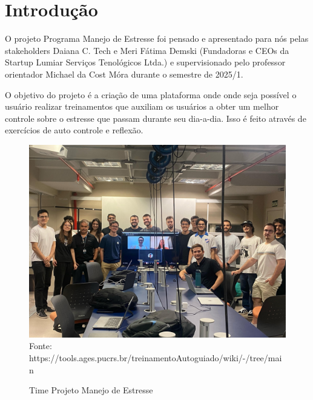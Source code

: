 \section[Introdução]{Introdução}

O projeto Programa Manejo de Estresse foi pensado e apresentado para nós pelas stakeholders Daiana C. Tech e Meri Fátima Demski (Fundadoras e CEOs da Startup Lumiar Serviços Tenológicos Ltda.) e supervisionado pelo professor orientador Michael da Cost Móra durante o semestre de 2025/1.

O objetivo do projeto é a criação de uma plataforma onde onde seja possível o usuário realizar treinamentos que auxiliam os usuários a obter um melhor controle sobre o estresse que passam durante seu dia-a-dia. Isso é feito através de exercícios de auto controle e reflexão.

\begin{figure}[H]
    \centering
    \small
    \caption{Time Projeto Manejo de Estresse}
    \includegraphics[width=1\linewidth]{conteudo//4 - ages III//conteudo//figures//foto-time.jpg}
    Fonte: https://tools.ages.pucrs.br/treinamentoAutoguiado/wiki/-/tree/main
\end{figure}